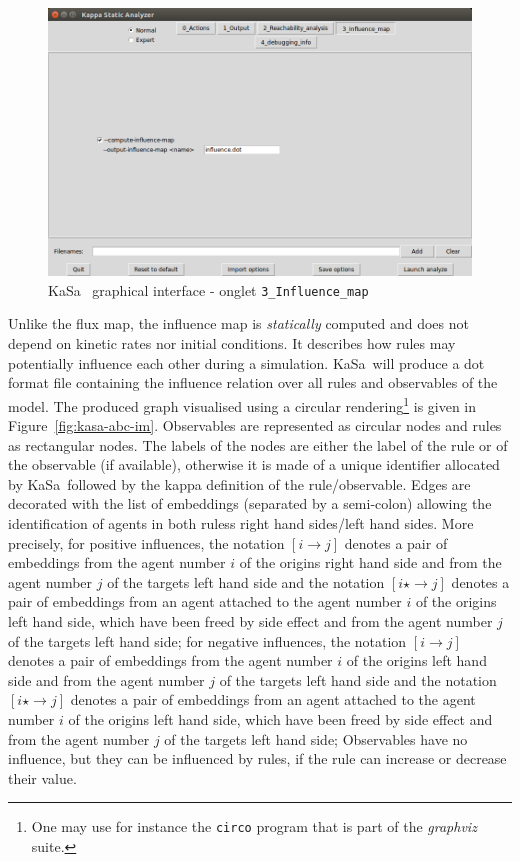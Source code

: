 \documentclass[11pt]{book}
\def\KaSa{\textsf{KaSa}}
\def\ttt#1{\texttt{#1}}
\def\rar{\rightarrow}
\begin{document}
\begin{figure}[htbp]
\centering
\includegraphics[width=12cm,natwidth=920pt,natheight=582pt]{img/kasa_3.png}
\caption{\KaSa~ graphical interface - onglet \texttt{3\_Influence\_map}}
\label{fig:kasa:3}
\end{figure}

Unlike the flux map, the influence map is \emph{statically} computed and does not depend on kinetic rates nor initial conditions. It describes how rules may potentially influence each other during a simulation. \KaSa~will produce a dot format file containing the influence relation over all rules and observables of the model. The produced graph visualised using a circular rendering\footnote{One may use for instance the \ttt{circo} program that is part of the \textit{graphviz} suite.} is given in Figure~\ref{fig:kasa-abc-im}. Observables are represented as circular nodes and rules as rectangular nodes. The labels of the nodes are either the label of the rule or of the observable (if available), otherwise it is made of a unique identifier allocated by \KaSa~followed by the kappa definition of the rule/observable. 
Edges are decorated with the list of embeddings (separated by a semi-colon) allowing the identification of agents in both rules{\textquotesingle}s right hand sides/left hand sides. 
More precisely, for positive influences,  the notation $[i\rar j]$ denotes a pair of embeddings from the agent number $i$ of the origin{\textquotesingle}s right hand side and from the agent number $j$ of the target{\textquotesingle}s left hand side and the notation $[i\star \rar j]$ denotes a pair of embeddings from an agent attached to the agent number $i$  of the origin{\textquotesingle}s left hand side, which have been freed by side effect  and   from the agent number $j$ of the target{\textquotesingle}s left hand side; for negative influences,  the notation $[i\rar j]$ denotes a pair of embeddings from the agent number $i$ of the origin{\textquotesingle}s left hand side and from the agent number $j$ of the target{\textquotesingle}s left hand side and the notation $[i\star \rar j]$ denotes a pair of embeddings from an agent attached to the agent number $i$  of the origin{\textquotesingle}s left hand side, which have been freed by side effect  and   from the agent number $j$ of the target{\textquotesingle}s left hand side;
 Observables have no influence, but they can be influenced by rules, if the rule can increase or decrease their value. 
\end{document}
